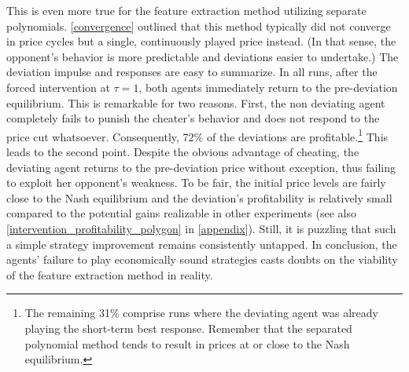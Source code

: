 This is even more true for the feature extraction method utilizing separate polynomials. \autoref{convergence} outlined that this method typically did not converge in price cycles but a single, continuously played price instead. (In that sense, the opponent's behavior is more predictable and deviations easier to undertake.) The deviation impulse and responses are easy to summarize. In all runs, after the forced intervention at $\tau = 1$, both agents immediately return to the pre-deviation equilibrium. This is remarkable for two reasons. First, the non deviating agent completely fails to punish the cheater's behavior and does not respond to the price cut whatsoever. Consequently, 72\% of the deviations are profitable.\footnote{The remaining 31\% comprise runs where the deviating agent was already playing the short-term best response. Remember that the separated polynomial method tends to result in prices at or close to the Nash equilibrium.} This leads to the second point. Despite the obvious advantage of cheating, the deviating agent returns to the pre-deviation price without exception, thus failing to exploit her opponent's weakness. To be fair, the initial price levels are fairly close to the Nash equilibrium and the deviation's profitability is relatively small compared to the potential gains realizable in other experiments (see also \autoref{intervention_profitability_polygon} in \autoref{appendix}). Still, it is puzzling that such a simple strategy improvement remains consistently untapped. In conclusion, the agents' failure to play economically sound strategies casts doubts on the viability of the feature extraction method in reality.

